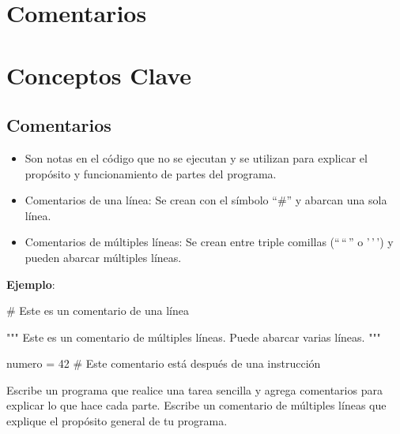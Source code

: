 \documentclass[
  a4paper,
  DIV=11,
  numbers=noendperiod,
  onepage,
  openany]{scrreprt}
\newenvironment{Shaded}{\begin{snugshade}}{\end{snugshade}}
\newcommand{\CommentTok}[1]{\textcolor[rgb]{0.37,0.37,0.37}{#1}}
\newcommand{\DecValTok}[1]{\textcolor[rgb]{0.68,0.00,0.00}{#1}}
\newcommand{\NormalTok}[1]{\textcolor[rgb]{0.00,0.23,0.31}{#1}}
\newcommand{\OperatorTok}[1]{\textcolor[rgb]{0.37,0.37,0.37}{#1}}
\providecommand{\tightlist}{%
  \setlength{\itemsep}{0pt}\setlength{\parskip}{0pt}}\usepackage{longtable,booktabs,array}
\begin{document}
\section{Comentarios}\label{comentarios}

\section{Conceptos Clave}\label{conceptos-clave-3}

\subsection{Comentarios}\label{comentarios-1}

\begin{itemize}
\tightlist
\item
  Son notas en el código que no se ejecutan y se utilizan para explicar
  el propósito y funcionamiento de partes del programa.
\item
  Comentarios de una línea: Se crean con el símbolo ``\#'' y abarcan una
  sola línea.
\item
  Comentarios de múltiples líneas: Se crean entre triple comillas
  (``\,``\,'' o '\,'\,') y pueden abarcar múltiples líneas.
\end{itemize}

\textbf{Ejemplo}:

\begin{Shaded}
\begin{Highlighting}[]
\CommentTok{\# Este es un comentario de una línea}

\CommentTok{"""}
\CommentTok{Este es un comentario}
\CommentTok{de múltiples líneas.}
\CommentTok{Puede abarcar varias líneas.}
\CommentTok{"""}

\NormalTok{numero }\OperatorTok{=} \DecValTok{42}  \CommentTok{\# Este comentario está después de una instrucción}
\end{Highlighting}
\end{Shaded}

\begin{tcolorbox}[enhanced jigsaw, leftrule=.75mm, bottomtitle=1mm, title=\textcolor{quarto-callout-tip-color}{\faLightbulb}\hspace{0.5em}{Actividad Práctica}, colbacktitle=quarto-callout-tip-color!10!white, coltitle=black, bottomrule=.15mm, colframe=quarto-callout-tip-color-frame, titlerule=0mm, opacityback=0, rightrule=.15mm, toptitle=1mm, opacitybacktitle=0.6, arc=.35mm, breakable, colback=white, toprule=.15mm, left=2mm]

Escribe un programa que realice una tarea sencilla y agrega comentarios
para explicar lo que hace cada parte. Escribe un comentario de múltiples
líneas que explique el propósito general de tu programa.

\end{tcolorbox}
\end{document}
